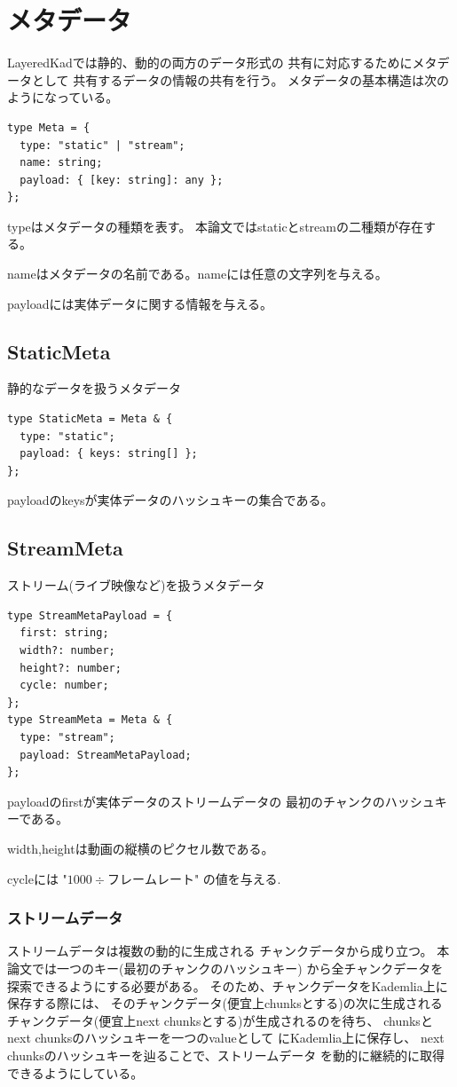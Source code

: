 \documentclass[sotsuron]{jcsie}
\begin{document}
\section{メタデータ}
LayeredKadでは静的、動的の両方のデータ形式の
共有に対応するためにメタデータとして
共有するデータの情報の共有を行う。
メタデータの基本構造は次のようになっている。
\begin{lstlisting}
type Meta = {
  type: "static" | "stream";
  name: string;
  payload: { [key: string]: any };
};
\end{lstlisting}

typeはメタデータの種類を表す。
本論文ではstaticとstreamの二種類が存在する。

nameはメタデータの名前である。nameには任意の文字列を与える。

payloadには実体データに関する情報を与える。

\subsection{StaticMeta}
静的なデータを扱うメタデータ
\begin{lstlisting}
type StaticMeta = Meta & {
  type: "static";
  payload: { keys: string[] };
};
\end{lstlisting}

payloadのkeysが実体データのハッシュキーの集合である。

\subsection{StreamMeta}
ストリーム(ライブ映像など)を扱うメタデータ
\begin{lstlisting}
type StreamMetaPayload = {
  first: string;
  width?: number;
  height?: number;
  cycle: number;
};	
type StreamMeta = Meta & {
  type: "stream";
  payload: StreamMetaPayload;
};  
\end{lstlisting}

payloadのfirstが実体データのストリームデータの
最初のチャンクのハッシュキーである。

width,heightは動画の縦横のピクセル数である。

cycleには "$ 1000 \div フレームレート $" の値を与える.

\subsubsection{ストリームデータ}
ストリームデータは複数の動的に生成される
チャンクデータから成り立つ。
本論文では一つのキー(最初のチャンクのハッシュキー)
から全チャンクデータを探索できるようにする必要がある。
そのため、チャンクデータをKademlia上に保存する際には、
そのチャンクデータ(便宜上chunksとする)の次に生成される
チャンクデータ(便宜上next chunksとする)が生成されるのを待ち、
chunksとnext chunksのハッシュキーを一つのvalueとして
にKademlia上に保存し、
next chunksのハッシュキーを辿ることで、ストリームデータ
を動的に継続的に取得できるようにしている。
\end{document}
